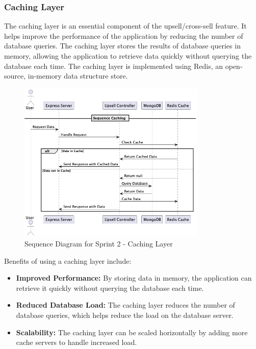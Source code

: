 \subsubsection{Caching Layer}

The caching layer is an essential component of the upsell/cross-sell feature. It helps improve the performance of the application by reducing the number of database queries. The caching layer stores the results of database queries in memory, allowing the application to retrieve data quickly without querying the database each time. The caching layer is implemented using Redis, an open-source, in-memory data structure store.

\begin{figure}[H]
    \centering
    \includegraphics[width=0.8\textwidth]{images/sprintTwoCacheSequence.png}
    \caption{Sequence Diagram for Sprint 2 - Caching Layer}
    \label{fig:sequence_diagram_sprint2_cache}
\end{figure}

Benefits of using a caching layer include:

\begin{itemize}
    \item \textbf{Improved Performance:} By storing data in memory, the application can retrieve it quickly without querying the database each time.
    \item \textbf{Reduced Database Load:} The caching layer reduces the number of database queries, which helps reduce the load on the database server.
    \item \textbf{Scalability:} The caching layer can be scaled horizontally by adding more cache servers to handle increased load.
\end{itemize}

